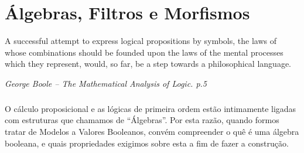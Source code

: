 \chapter{Álgebras, Filtros e Morfismos}
    \epigraph{\justify
            A successful attempt to express 
            logical propositions by symbols, 
            the laws of whose combinations 
            should be founded upon the laws 
            of the mental processes which 
            they represent, would, so far, 
            be a step towards a philosophical 
            language.
        }{\textit{George Boole -- The Mathematical Analysis of Logic. p.5}}    
    \cls

    \paragraph{}
        O cálculo proposicional e as lógicas de primeira ordem 
        estão intimamente ligadas com estruturas que chamamos 
        de ``Álgebras''. Por esta razão, quando formos tratar 
        de Modelos a Valores Booleanos, convém compreender o quê
        é uma álgebra booleana, e quais propriedades exigimos 
        sobre esta a fim de fazer a construção.